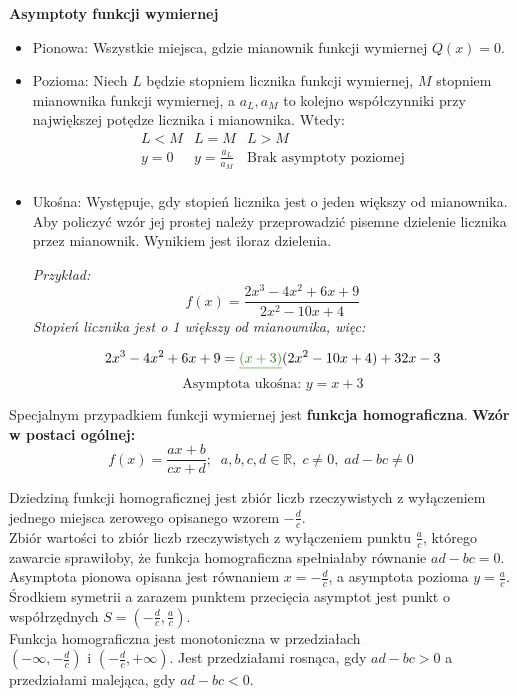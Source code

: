 \documentclass[14pt,a4paper]{extarticle}
\begin{document}
\noindent\textbf{Asymptoty funkcji wymiernej}
\begin{itemize}
   \item Pionowa:\hfill\break
   Wszystkie miejsca, gdzie mianownik funkcji wymiernej $Q(x) = 0$.
   \item Pozioma:\hfill\break
   Niech $L$ będzie stopniem licznika funkcji wymiernej, $M$ stopniem mianownika funkcji wymiernej, a $a_{L}, a_{M}$ to kolejno
   współczynniki przy największej potędze licznika i mianownika.
   Wtedy:\hfill\break
   \begin{equation*}      
   \begin{array}{c|c|c}
      L < M & L = M & L > M\\
      \hline
      y = 0 & y = \frac{a_{L}}{a_{M}} & \text{Brak asymptoty poziomej}\\
   \end{array}
   \end{equation*}
   \item Ukośna:\hfill\break
   Występuje, gdy stopień licznika jest o jeden większy od mianownika.
   Aby policzyć wzór jej prostej należy przeprowadzić pisemne dzielenie licznika przez mianownik.
   Wynikiem jest iloraz dzielenia.

   \newpage
\textit{Przykład:}
$$f(x) = \frac{2x^{3}-4x^{2}+6x+9}{2x^{2}-10x+4}$$\hfill\break
\textit{Stopień licznika jest o 1 większy od mianownika, więc:}
   \begin{center}
   \end{center}\hfill\break
$$2x^{3}-4x^{2}+6x+9 = \textcolor{OliveGreen}{\underline{(x+3)}}(2x^{2}-10x+4)+32x - 3$$
$$\text{Asymptota ukośna: }y = x + 3$$

\end{itemize}\hfill\break
\smallskip

\noindent Specjalnym przypadkiem funkcji wymiernej jest \textbf{funkcja homograficzna}.\hfill\break
\textbf{Wzór w postaci ogólnej:}
$$f(x) = \frac{ax + b}{cx + d};\;\;a, b, c, d \in \mathbb{R},\;c\neq 0,\; ad - bc \neq 0$$
   
\noindent Dziedziną funkcji homograficznej jest zbiór liczb rzeczywistych z wyłączeniem jednego miejsca zerowego
opisanego wzorem $-\frac{d}{c}$.\hfill\break\\
 Zbiór wartości to zbiór liczb rzeczywistych z wyłączeniem punktu $\frac{a}{c}$,
którego zawarcie sprawiłoby, że funkcja homograficzna spełniałaby równanie $ad - bc = 0$.\hfill\break\\
Asymptota pionowa opisana jest równaniem $x = -\frac{d}{c}$, a asymptota pozioma $y = \frac{a}{c}$.\hfill\break\\
Środkiem symetrii a zarazem punktem przecięcia asymptot jest punkt o współrzędnych $S = \left(-\frac{d}{c}, \frac{a}{c}\right)$.\hfill\break\\
Funkcja homograficzna jest monotoniczna w przedziałach $\left(-\infty, -\frac{d}{c}\right) \text{ i } \left(-\frac{d}{c}, +\infty\right)$.
Jest przedziałami rosnąca, gdy $ad - bc > 0$ a przedziałami malejąca, gdy $ad - bc < 0$.
\newpage
\end{document}
